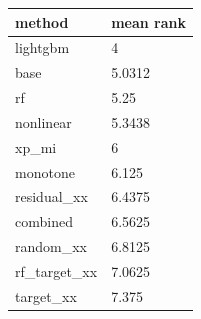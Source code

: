 \begin{tabular}{ll}
\toprule
method & mean rank \\
\midrule
lightgbm & 4 \\
base & 5.0312 \\
rf & 5.25 \\
nonlinear & 5.3438 \\
xp\_mi & 6 \\
monotone & 6.125 \\
residual\_xx & 6.4375 \\
combined & 6.5625 \\
random\_xx & 6.8125 \\
rf\_target\_xx & 7.0625 \\
target\_xx & 7.375 \\
\bottomrule
\end{tabular}
